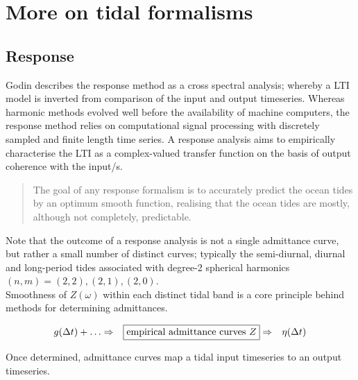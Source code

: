 \chapter{More on tidal formalisms}
\label{appendix:tideFormalisms}
\section{Response}
Godin \citep{Godin:1991vx} describes the response method as a cross spectral analysis; whereby a LTI model is inverted from comparison of the input and output timeseries.   
Whereas harmonic methods evolved well before the availability of machine computers, the response method relies on computational signal processing with discretely sampled and finite length time series.
A response analysis aims to empirically characterise the LTI as a complex-valued transfer function on the basis of output coherence with the input/s. 
\begin{quotation}
The goal of any response formalism is to accurately predict the ocean tides by an optimum smooth function, realising that the ocean tides are mostly, although not completely, predictable.
\end{quotation}

Note that the outcome of a response analysis is not a single admittance curve, but rather a small number of distinct curves; typically the semi-diurnal, diurnal and long-period tides associated with degree-2 spherical harmonics $(n,m)=(2,2),(2,1),(2,0)$.\\
Smoothness of $Z(\omega)$ within each distinct tidal band is a core principle behind methods for determining admittances.  

\begin{align}
\label{E:response}
g(\Delta t) + \dots &\Rightarrow & \fbox{empirical admittance curves $Z$} &\Rightarrow & \mbox{$\eta(\Delta t)$}  %
\end{align}

Once determined, admittance curves map a tidal input timeseries to an output timeseries.

